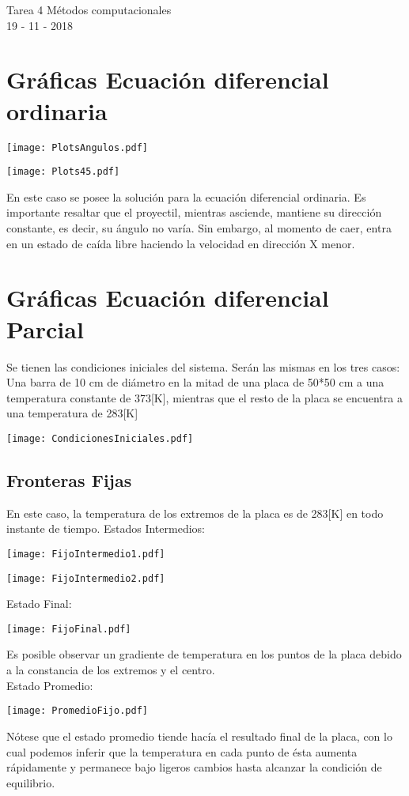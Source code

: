 \documentclass[11pt,letterpaper]{exam}
\begin{document}
\begin{center}
{\Large Tarea 4 Métodos computacionales} \\
19 - 11 - 2018\\
\end{center}


\noindent
\section{Gr\'aficas Ecuación diferencial ordinaria}
\begin{center}
\texttt{[image: PlotsAngulos.pdf]} 
\end{center}
\begin{center}
\texttt{[image: Plots45.pdf]} 
\end{center}
En este caso se posee la solución para la ecuación diferencial ordinaria. Es importante resaltar que el proyectil, mientras asciende, mantiene su dirección constante, es decir, su ángulo no varía. Sin embargo, al momento de caer, entra en un estado de caída libre haciendo la velocidad en dirección X menor. 
\noindent
\section{Gr\'aficas Ecuación diferencial Parcial}
Se tienen las condiciones iniciales del sistema. Serán las mismas en los tres casos: Una barra de 10 cm de diámetro en la mitad de una placa de 50*50 cm a una temperatura constante de 373[K], mientras que el resto de la placa se encuentra a una temperatura de 283[K]
\begin{center}
\texttt{[image: CondicionesIniciales.pdf]} 
\end{center}
\subsection{Fronteras Fijas}
En este caso, la temperatura de los extremos de la placa es de 283[K] en todo instante de tiempo. 
Estados Intermedios:
\begin{center}
\texttt{[image: FijoIntermedio1.pdf]} 
\end{center}
\begin{center}
\texttt{[image: FijoIntermedio2.pdf]} 
\end{center}
Estado Final:
\begin{center}
\texttt{[image: FijoFinal.pdf]}
\end{center}
Es posible observar un gradiente de temperatura en los puntos de la placa debido a la constancia de los extremos y el centro.\\
Estado Promedio:
\begin{center}
\texttt{[image: PromedioFijo.pdf]} 
\end{center}
Nótese que el estado promedio tiende hacía el resultado final de la placa, con lo cual podemos inferir que la temperatura en cada punto de ésta aumenta rápidamente y permanece bajo ligeros cambios hasta alcanzar la condición de equilibrio.
\end{document}
